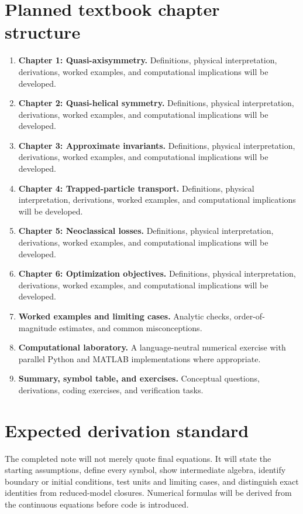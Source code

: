 \documentclass[11pt]{article}
\begin{document}
\section{Planned textbook chapter structure}
\begin{enumerate}[leftmargin=1.8em]
\item \textbf{Chapter 1: Quasi-axisymmetry.} Definitions, physical interpretation, derivations, worked examples, and computational implications will be developed.
\item \textbf{Chapter 2: Quasi-helical symmetry.} Definitions, physical interpretation, derivations, worked examples, and computational implications will be developed.
\item \textbf{Chapter 3: Approximate invariants.} Definitions, physical interpretation, derivations, worked examples, and computational implications will be developed.
\item \textbf{Chapter 4: Trapped-particle transport.} Definitions, physical interpretation, derivations, worked examples, and computational implications will be developed.
\item \textbf{Chapter 5: Neoclassical losses.} Definitions, physical interpretation, derivations, worked examples, and computational implications will be developed.
\item \textbf{Chapter 6: Optimization objectives.} Definitions, physical interpretation, derivations, worked examples, and computational implications will be developed.
\item \textbf{Worked examples and limiting cases.} Analytic checks, order-of-magnitude estimates, and common misconceptions.
\item \textbf{Computational laboratory.} A language-neutral numerical exercise with parallel Python and MATLAB implementations where appropriate.
\item \textbf{Summary, symbol table, and exercises.} Conceptual questions, derivations, coding exercises, and verification tasks.
\end{enumerate}

\section{Expected derivation standard}
The completed note will not merely quote final equations. It will state the starting assumptions, define every symbol, show intermediate algebra, identify boundary or initial conditions, test units and limiting cases, and distinguish exact identities from reduced-model closures. Numerical formulas will be derived from the continuous equations before code is introduced.
\end{document}
